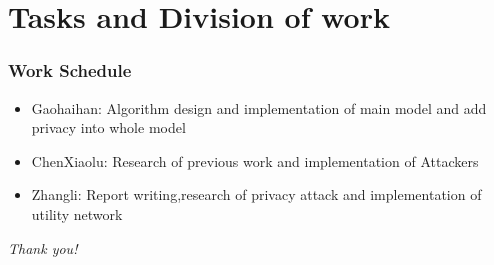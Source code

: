 \documentclass{beamer}
\begin{document}
\section{Tasks and Division of work}
\begin{frame}
  \frametitle{Work Schedule}
  \begin{itemize}
    \item Gaohaihan: Algorithm design and implementation of main model and add privacy into whole model
    \item ChenXiaolu: Research of previous work and implementation of Attackers
    \item Zhangli: Report writing,research of privacy attack and implementation of utility network
  \end{itemize}
\end{frame}

\begin{frame}{}
  \centering \Large
  \emph{Thank you!}
\end{frame}
\begin{frame}


  
\end{frame}
\end{document}

